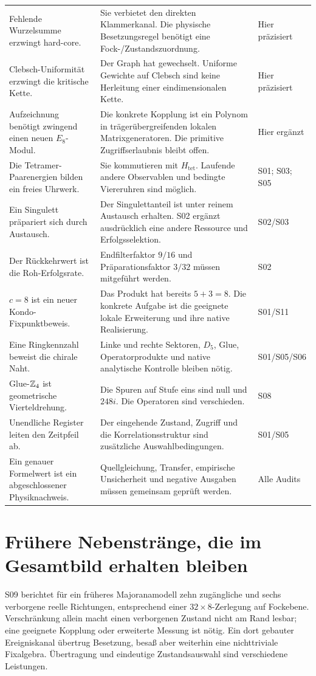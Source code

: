 \begin{longtable}{L{46mm}L{77mm}L{27mm}}
Fehlende Wurzelsumme erzwingt hard-core.&Sie verbietet den direkten Klammerkanal. Die physische Besetzungsregel benötigt eine Fock-/Zustandszuordnung.&Hier präzisiert\\
Clebsch-Uniformität erzwingt die kritische Kette.&Der Graph hat gewechselt. Uniforme Gewichte auf Clebsch sind keine Herleitung einer eindimensionalen Kette.&Hier präzisiert\\
Aufzeichnung benötigt zwingend einen neuen $E_8$-Modul.&Die konkrete Kopplung ist ein Polynom in trägerübergreifenden lokalen Matrixgeneratoren. Die primitive Zugriffserlaubnis bleibt offen.&Hier ergänzt\\
Die Tetramer-Paarenergien bilden ein freies Uhrwerk.&Sie kommutieren mit $H_{\mathrm{tet}}$. Laufende andere Observablen und bedingte Viereruhren sind möglich.&S01; S03; S05\\
Ein Singulett präpariert sich durch Austausch.&Der Singulettanteil ist unter reinem Austausch erhalten. S02 ergänzt ausdrücklich eine andere Ressource und Erfolgsselektion.&S02/S03\\
Der Rückkehrwert ist die Roh-Erfolgsrate.&Endfilterfaktor $9/16$ und Präparationsfaktor $3/32$ müssen mitgeführt werden.&S02\\
$c=8$ ist ein neuer Kondo-Fixpunktbeweis.&Das Produkt hat bereits $5+3=8$. Die konkrete Aufgabe ist die geeignete lokale Erweiterung und ihre native Realisierung.&S01/S11\\
Eine Ringkennzahl beweist die chirale Naht.&Linke und rechte Sektoren, $D_5$, Glue, Operatorprodukte und native analytische Kontrolle bleiben nötig.&S01/S05/S06\\
Glue-$\mathbb Z_4$ ist geometrische Vierteldrehung.&Die Spuren auf Stufe eins sind null und $248i$. Die Operatoren sind verschieden.&S08\\
Unendliche Register leiten den Zeitpfeil ab.&Der eingehende Zustand, Zugriff und die Korrelationsstruktur sind zusätzliche Auswahlbedingungen.&S01/S05\\
Ein genauer Formelwert ist ein abgeschlossener Physiknachweis.&Quellgleichung, Transfer, empirische Unsicherheit und negative Ausgaben müssen gemeinsam geprüft werden.&Alle Audits\\\bottomrule
\end{longtable}

\section{Frühere Nebenstränge, die im Gesamtbild erhalten bleiben}
S09 berichtet für ein früheres Majoranamodell zehn zugängliche und sechs verborgene reelle Richtungen, entsprechend einer $32\times8$-Zerlegung auf Fockebene. Verschränkung allein macht einen verborgenen Zustand nicht am Rand lesbar; eine geeignete Kopplung oder erweiterte Messung ist nötig. Ein dort gebauter Ereigniskanal übertrug Besetzung, besaß aber weiterhin eine nichttriviale Fixalgebra. Übertragung und eindeutige Zustandsauswahl sind verschiedene Leistungen.

